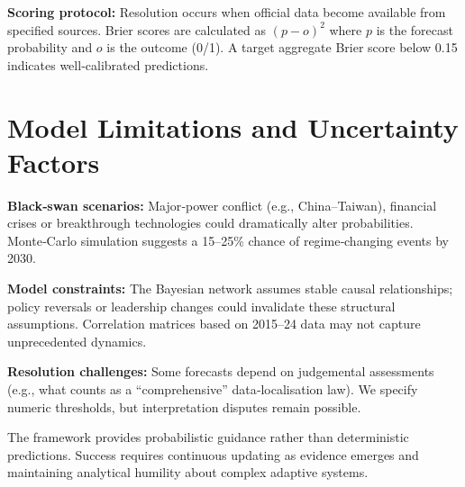 \documentclass{article}
\begin{document}
\textbf{Scoring protocol:} Resolution occurs when official data become available from specified sources.  Brier scores are calculated as $(p - o)^2$ where $p$ is the forecast probability and $o$ is the outcome (0/1).  A target aggregate Brier score below 0.15 indicates well‑calibrated predictions.

\section{Model Limitations and Uncertainty Factors}

\textbf{Black‑swan scenarios:} Major‑power conflict (e.g., China–Taiwan), financial crises or breakthrough technologies could dramatically alter probabilities.  Monte‑Carlo simulation suggests a 15–25\% chance of regime‑changing events by 2030.

\textbf{Model constraints:} The Bayesian network assumes stable causal relationships; policy reversals or leadership changes could invalidate these structural assumptions.  Correlation matrices based on 2015–24 data may not capture unprecedented dynamics.

\textbf{Resolution challenges:} Some forecasts depend on judgemental assessments (e.g., what counts as a “comprehensive” data‑localisation law).  We specify numeric thresholds, but interpretation disputes remain possible.

The framework provides probabilistic guidance rather than deterministic predictions.  Success requires continuous updating as evidence emerges and maintaining analytical humility about complex adaptive systems.
\end{document}
